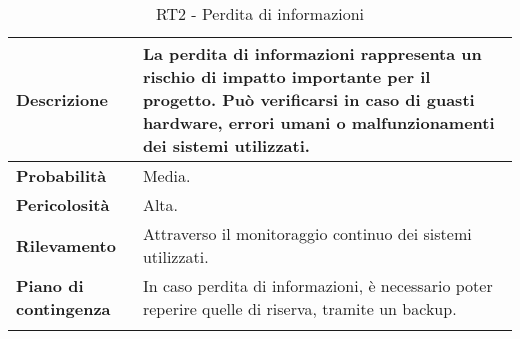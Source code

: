 \begin{longtable}{ | l | p{10cm} | }
	\hline
	\textbf{Descrizione}          & La perdita di informazioni rappresenta un rischio di impatto importante per il progetto. Può verificarsi in caso di guasti hardware, errori umani o malfunzionamenti dei sistemi utilizzati. \\
	\hline
	\textbf{Probabilità}          & Media.                                                                                                                                                                                       \\
	\hline
	\textbf{Pericolosità}         & Alta.                                                                                                                                                                                        \\
	\hline
	\textbf{Rilevamento}          & Attraverso il monitoraggio continuo dei sistemi utilizzati.                                                                                                                                  \\
	\hline
	\textbf{Piano di contingenza} & In caso perdita di informazioni, è necessario poter reperire quelle di riserva, tramite un backup.                                                                                           \\
	\hline
	\caption{RT2 - Perdita di informazioni}
	\label{table:6}
\end{longtable}

